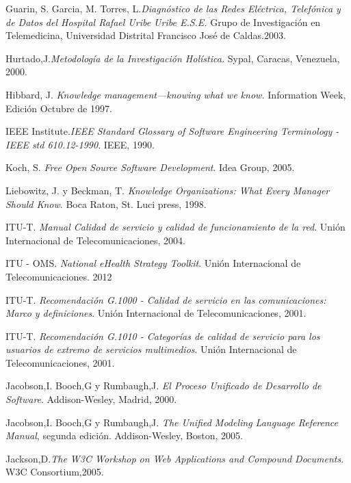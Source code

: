 \begin{thebibliography}{}
 Guarin, S. Garcia, M. Torres, L.\textit{Diagnóstico de las Redes Eléctrica, Telefónica y de Datos del Hospital Rafael Uribe Uribe E.S.E.} Grupo de Investigación en Telemedicina,  Universidad Distrital Francisco José de Caldas.2003.

 Hurtado,J.\textit{Metodología de la Investigación Holística.} Sypal, Caracas, Venezuela, 2000.

 Hibbard, J. \textit{Knowledge management—knowing what we know.} Information Week, Edición Octubre de 1997.

 IEEE Institute.\textit{IEEE Standard Glossary of Software Engineering Terminology - IEEE std 610.12-1990}. IEEE, 1990.

 Koch, S. \textit{Free Open Source Software Development}. Idea Group, 2005.

 Liebowitz, J. y Beckman, T. \textit{Knowledge Organizations: What Every Manager Should Know}. Boca Raton, St. Luci press, 1998.

 ITU-T. \textit{Manual Calidad de servicio y calidad de funcionamiento de la red}. Unión Internacional de Telecomunicaciones, 2004.

 ITU - OMS. \textit{National eHealth Strategy Toolkit}. Unión Internacional de Telecomunicaciones. 2012 

 ITU-T. \textit{Recomendación G.1000 - Calidad de servicio en las comunicaciones: Marco y definiciones}. Unión Internacional de Telecomunicaciones, 2001.

 ITU-T. \textit{Recomendación G.1010 - Categorías de calidad de servicio para los usuarios de extremo de servicios multimedios}. Unión Internacional de Telecomunicaciones, 2001.

 Jacobson,I. Booch,G y Rumbaugh,J. \textit{El Proceso Unificado de Desarrollo de Software}. Addison-Wesley, Madrid, 2000.

 Jacobson,I. Booch,G y Rumbaugh,J. \textit{The Unified Modeling Language Reference Manual}, segunda edición. Addison-Wesley, Boston, 2005.

 Jackson,D.\textit{The W3C Workshop on Web Applications and Compound Documents}. W3C Consortium,2005.


\end{thebibliography}

